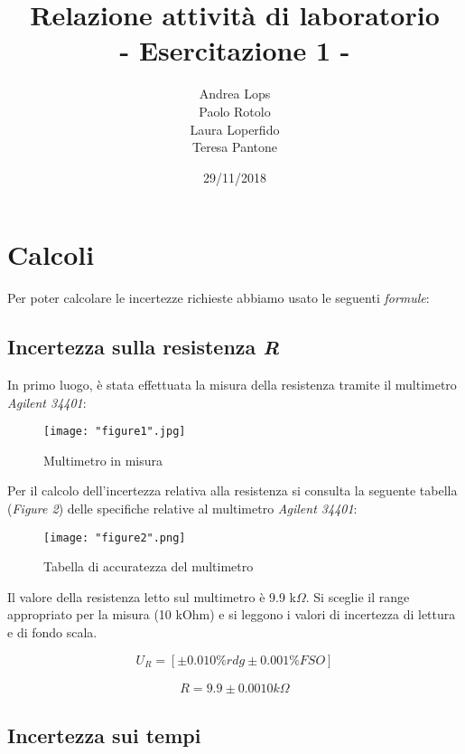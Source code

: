 \documentclass[a4paper]{article}
\title{\textbf{Relazione attività di laboratorio}\\{\normalsize - Esercitazione 1 -}}
\author{Andrea Lops\\
		Paolo Rotolo\\
		Laura Loperfido\\
		Teresa Pantone
	   }
\date{29/11/2018}
\begin{document}
\maketitle

\section{Calcoli}

Per poter calcolare le incertezze richieste abbiamo usato le seguenti \emph{formule}:\\
\subsection {Incertezza sulla resistenza \emph{R}}

In primo luogo, è stata effettuata la misura della resistenza tramite il multimetro \emph{Agilent 34401}:

\begin{figure}[htp]
	\centering
	\texttt{[image: "figure1".jpg]}
	\caption{Multimetro in misura}
	\label{}
\end{figure}
\noindent 
Per il calcolo dell'incertezza relativa alla resistenza si consulta la seguente tabella (\emph{Figure 2}) delle specifiche relative al multimetro \emph{Agilent 34401}:
\begin{center}
	\begin{figure}[htp]
		\centering
		\texttt{[image: "figure2".png]}
		\caption{Tabella di accuratezza del multimetro}
		\label{a}
	\end{figure}
\end{center}

Il valore della resistenza letto sul multimetro è  9.9 k$\Omega$. Si sceglie il range appropriato per la misura (10 kOhm) e si leggono i valori di incertezza di lettura e di fondo scala.

\begin{Large} 
	\begin{equation} 
		U_{R} = [\pm 0.010\%rdg \pm 0.001\% FSO]
	 \end{equation}
	 
	 \begin{eqnarray*} 
	 	R = 9.9 \pm 0.0010 k\Omega 
	 \end{eqnarray*}
\end{Large}

\subsection {Incertezza sui tempi}
\end{document}
